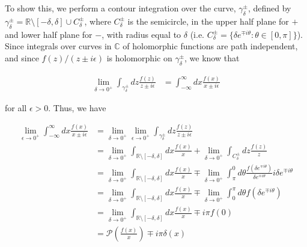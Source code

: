 \documentclass[]{article}
\begin{document}
\begin{enumerate}[1)]
To show this, we perform a contour integration over the curve, $\gamma_\delta^\pm$, defined by $\gamma_\delta^\pm = \mathbb{R} \setminus \left[- \delta, \delta \right] \cup C_\delta^\pm$, where $C_\delta^\pm$ is the semicircle, in the upper half plane for $+$ and lower half plane for $-$, with radius equal to $\delta$ (i.e. $C_\delta^\pm = \{ \delta e^{ \mp i\theta}: \theta\in \left[0, \pi \right] \}$). Since integrals over curves in $\mathbb{C}$ of holomorphic functions are path independent, and since $f(z)/(z \pm i \epsilon)$ is holomorphic on $\gamma_\delta^\pm$, we know that 

\begin{equation}
\begin{split}
\lim_{\delta \to 0^+ } \int_{\gamma_\delta^\pm} dz \frac{f(z)}{z \pm i\epsilon} & =  \int_{-\infty}^{\infty}  dx \frac{f(x)}{ x \pm i\epsilon}
\end{split}
\end{equation}

for all $\epsilon >0$. Thus, we have

\begin{equation}
\begin{split}
\lim_{\epsilon \to 0^+ } \int_{-\infty}^{\infty}  dx \frac{f(x)}{ x \pm i\epsilon} & = \lim_{\delta \to 0^+ } \lim_{\epsilon \to 0^+ } \int_{\gamma_\delta^\pm} dz \frac{f(z)}{z \pm i\epsilon}  \\
& =  \lim_{\delta \to 0^+ } \int_{ \mathbb{R} \setminus \left[- \delta, \delta \right] } dx \frac{f(x)}{x }  +   \lim_{\delta \to 0^+ } \int_{C_\delta^\pm} dz \frac{f(z)}{z}  \\
& =   \lim_{\delta \to 0^+ } \int_{ \mathbb{R} \setminus \left[- \delta, \delta \right] } dx \frac{f(x)}{x }  \mp   \lim_{\delta \to 0^+ } \int_{\pi}^0 d\theta \frac{f( \delta e^{ \mp i \theta })}{ \delta e^{ \mp i \theta} } i \delta e^{ \mp i \theta } \\
& =   \lim_{\delta \to 0^+ } \int_{ \mathbb{R} \setminus \left[- \delta, \delta \right] } dx \frac{f(x)}{x }  \mp   \lim_{\delta \to 0^+ } \int_{0}^\pi d\theta f( \delta e^{ \mp i \theta })\\
& =   \lim_{\delta \to 0^+ } \int_{ \mathbb{R} \setminus \left[- \delta, \delta \right] } dx \frac{f(x)}{x }  \mp  i \pi f(0) \\
& = \mathscr{P} \left(   \frac{f(x)}{x} \right)   \mp i \pi \delta(x) \\
\end{split}
\end{equation}


\end{enumerate}
\end{document}
